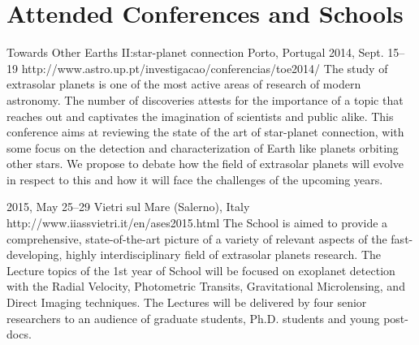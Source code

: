 \section{Attended Conferences and Schools}

{Towards Other Earths II:\@The star-planet connection}%
{Porto, Portugal}%
{2014, Sept. 15--19}%
{http://www.astro.up.pt/investigacao/conferencias/toe2014/}%
{}%
{The study of extrasolar planets is one of the most active areas of research of modern astronomy. The number of discoveries attests for the importance of a topic that reaches out and captivates the imagination of scientists and public alike. This conference aims at reviewing the state of the art of star-planet connection, with some focus on the detection and characterization of Earth like planets orbiting other stars. We propose to debate how the field of extrasolar planets will evolve in respect to this and how it will face the challenges of the upcoming years.}%

{2015, May 25--29}%
{Vietri sul Mare (Salerno), Italy}%
{http://www.iiassvietri.it/en/ases2015.html}%
{}%
{The School is aimed to provide a comprehensive, state-of-the-art picture of a variety of relevant aspects of the fast-developing, highly interdisciplinary field of extrasolar planets research.
The Lecture topics of the 1st year of School will be focused on exoplanet detection with the Radial Velocity, Photometric Transits, Gravitational Microlensing, and Direct Imaging techniques. The Lectures will be delivered by four senior researchers to an audience of graduate students, Ph.D. students and young post-docs.}%

